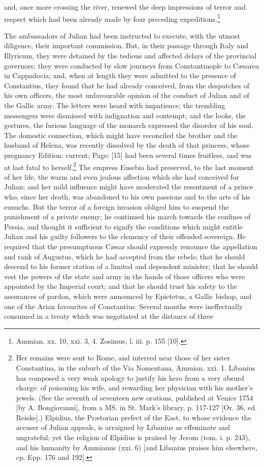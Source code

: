 and, once more crossing the river, renewed the deep impressions of terror and respect which had been already made by four preceding expeditions.\footnote{Ammian. xx. 10, xxi. 3, 4. Zosimus, l. iii. p. 155 [10].}

The ambassadors of Julian had been instructed to execute, with the utmost diligence, their important commission. But, in their passage through Italy and Illyricum, they were detained by the tedious and affected delays of the provincial governors; they were conducted by slow journeys from Constantinople to Cæsarea in Cappadocia; and, when at length they were admitted to the presence of Constantius, they found that he had already conceived, from the despatches of his own officers, the most unfavourable opinion of the conduct of Julian and of the Gallic army. The letters were heard with impatience; the trembling messengers were dismissed with indignation and contempt; and the looks, the gestures, the furious language of the monarch expressed the disorder of his soul. The domestic connection, which might have reconciled the brother and the husband of Helena, was recently dissolved by the death of that princess, whose pregnancy Edition: current; Page: [15] had been several times fruitless, and was at last fatal to herself.\footnote{Her remains were sent to Rome, and interred near those of her sister Constantina, in the suburb of the Via Nomentana, Ammian. xxi. 1. Libanius has composed a very weak apology to justify his hero from a very absurd charge: of poisoning his wife, and rewarding her physician with his mother\texthebrew{}’s jewels. (See the seventh of seventeen new orations, published at Venice 1754 [by A. Bongiovanni], from a MS. in St. Mark\texthebrew{}’s library, p. 117-127 [Or. 36, ed. Reiske].) Elpidius, the Prætorian prefect of the East, to whose evidence the accuser of Julian appeals, is arraigned by Libanius as effeminate and ungrateful; yet the religion of Elpidius is praised by Jerom (tom. i. p. 243), and his humanity by Ammianus (xxi. 6) [and Libanius praises him elsewhere, cp. Epp. 176 and 192].} The empress Eusebia had preserved, to the last moment of her life, the warm and even jealous affection which she had conceived for Julian; and her mild influence might have moderated the resentment of a prince who, since her death, was abandoned to his own passions and to the arts of his eunuchs. But the terror of a foreign invasion obliged him to suspend the punishment of a private enemy; he continued his march towards the confines of Persia, and thought it sufficient to signify the conditions which might entitle Julian and his guilty followers to the clemency of their offended sovereign. He required that the presumptuous Cæsar should expressly renounce the appellation and rank of Augustus, which he had accepted from the rebels; that he should descend to his former station of a limited and dependent minister; that he should vest the powers of the state and army in the hands of those officers who were appointed by the Imperial court; and that he should trust his safety to the assurances of pardon, which were announced by Epictetus, a Gallic bishop, and one of the Arian favourites of Constantius. Several months were ineffectually consumed in a treaty which was negotiated at the distance of three 